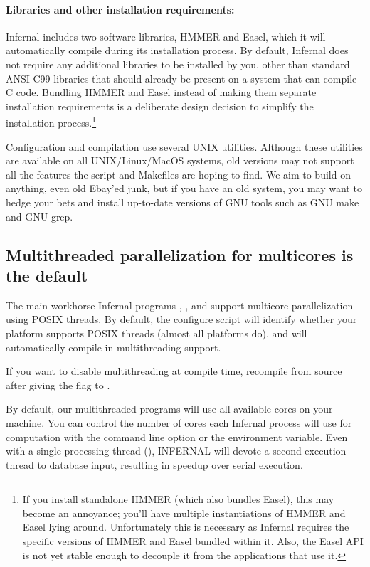 \paragraph{Libraries and other installation requirements:} Infernal includes
two software libraries, HMMER and Easel, which it will automatically
compile during its installation process.  By default, Infernal does
not require any additional libraries to be installed by you, other
than standard ANSI C99 libraries that should already be present on a
system that can compile C code. Bundling HMMER and Easel instead of
making them separate installation requirements is a deliberate design
decision to simplify the installation process.\footnote{If you install
standalone HMMER (which also bundles Easel), this may become an
annoyance; you'll have multiple instantiations of HMMER and Easel
lying around. Unfortunately this is necessary as Infernal requires the
specific versions of HMMER and Easel bundled within it. Also, the
Easel API is not yet stable enough to decouple it from the
applications that use it.}

Configuration and compilation use several UNIX utilities. Although
these utilities are available on all UNIX/Linux/MacOS systems, old
versions may not support all the features the 
script and Makefiles are hoping to find. We aim to build on anything,
even old Ebay'ed junk, but if you have an old system, you may want to
hedge your bets and install up-to-date versions of GNU tools such as
GNU make and GNU grep.

\subsection{Multithreaded parallelization for multicores is the default}

The main workhorse Infernal programs ,
,  and  support
multicore parallelization using POSIX threads. By default, the
configure script will identify whether your platform supports POSIX
threads (almost all platforms do), and will automatically compile in
multithreading support.

If you want to disable multithreading at compile time, recompile from
source after giving the  flag to
.

By default, our multithreaded programs will use all available cores on
your machine. You can control the number of cores each Infernal process
will use for computation with the  command line
option or the  environment variable. Even with a
single processing thread (), INFERNAL will devote a second
execution thread to database input, resulting in speedup
over serial execution.

